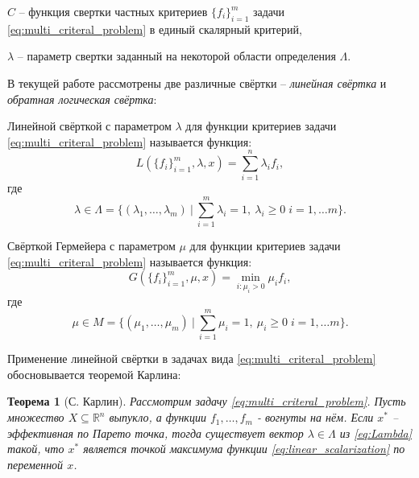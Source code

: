 $C$ – функция свертки частных критериев $\{f_i\}_{i=1}^m$ задачи 
\eqref{eq:multi_criteral_problem} в единый скалярный критерий,
 
$\lambda$ – параметр свертки заданный на некоторой
области определения $\Lambda$.
\newline

В текущей работе рассмотрены две различные свёртки --
\textit{линейная свёртка} и \textit{обратная логическая свёртка}:

\begin{Defenition}
	Линейной свёрткой с параметром $\lambda$ для функции критериев задачи
	\eqref{eq:multi_criteral_problem} называется 	\cite{ehrgott}
	функция:
	\begin{equation}
		\label{eq:linear_scalarization}
		L(\{f_i\}_{i=1}^{m}, \lambda, x) = 
		\sum_{i=1}^{n} \lambda_i f_i,
	\end{equation}
	где  
	\begin{equation}
		\label{eq:Lambda}
		\lambda \in 
		\Lambda = \{
			(\lambda_1, \ldots, \lambda_m) \:
			| \: \sum_{i=1}^m \lambda_i = 1, \: 
			  \lambda_i \geq 0 \; i = 1, \ldots m 
		\}.		
	\end{equation}
\end{Defenition}

\begin{Defenition}
	Свёрткой Гермейера с параметром $\mu$ для 
	функции критериев задачи \eqref{eq:multi_criteral_problem}
	называется \cite{germeyer} функция:
	\begin{equation}
		\label{eq:germeyer_scalarization}	
		G(\{f_i\}_{i=1}^{m}, \mu, x)=
		\min \limits_{i: \mu_i > 0} \mu_i f_i,
	\end{equation}
	где 
	\begin{equation}
		\label{eq:Mu}	
		\mu \in 
		M = \{
			(\mu_1, \ldots, \mu_m) \:
			| \: \sum_{i=1}^m \mu_i = 1, \: 
			  \mu_i \geq 0 \; i = 1, \ldots m 
		\}.
	\end{equation}
\end{Defenition}

Применение линейной свёртки в задачах вида
\eqref{eq:multi_criteral_problem} обосновывается теоремой Карлина:

\newtheorem{Theorem}{Теорема}
\begin{Theorem}[С. Карлин]
	Рассмотрим задачу \eqref{eq:multi_criteral_problem}. 
	Пусть множество $X \subseteq \mathbb{R}^n$ выпукло,
	а функции $f_1, \ldots, f_m$ - вогнуты на нём.
	Если $x^*$ – эффективная по Парето точка,
    тогда существует вектор $\lambda \in \Lambda$ из 
    \eqref{eq:Lambda} такой, что $x^*$ является точкой 
    максимума функции \eqref{eq:linear_scalarization} по переменной
    $x$. \cite{carlin}
\end{Theorem}

